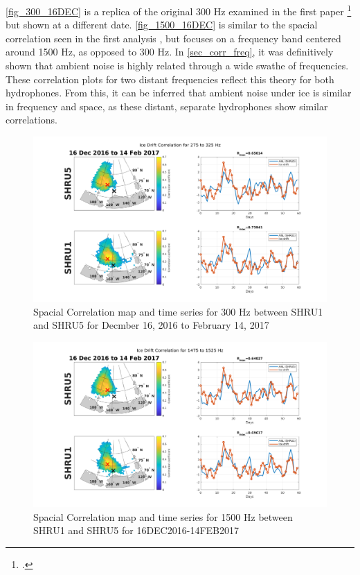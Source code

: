 \autoref{fig_300_16DEC} is a replica of the original 300 Hz examined in the first paper \footcite[]{Bonnel2021} but shown at a different date. \autoref{fig_1500_16DEC} is similar to the spacial correlation seen in the first analysis , but focuses on a frequency band centered around 1500 Hz, as opposed to 300 Hz. In \autoref{sec_corr_freq}, it was definitively shown that ambient noise is highly related through a wide swathe of frequencies. These correlation plots for two distant frequencies reflect this theory for both hydrophones. From this, it can be inferred that ambient noise under ice is similar in frequency and space, as these distant, separate hydrophones show similar correlations.   %

\begin{figure}[p]
\centering
\includegraphics[scale=0.35]{Figures/300_spatial_corr_20161216-20170214_275_325.png}
\caption{Spacial Correlation map and time series for 300 Hz between SHRU1 and SHRU5 for Decmber 16, 2016 to February 14, 2017}
\label{fig_300_16DEC}
\end{figure}

\begin{figure}[p]
\centering
\includegraphics[scale=0.35]{Figures/1500_spatial_corr_20161216-20170214_1475_1525.png}
\caption{Spacial Correlation map and time series for 1500 Hz between SHRU1 and SHRU5 for 16DEC2016-14FEB2017}
\label{fig_1500_16DEC}
\end{figure} 

